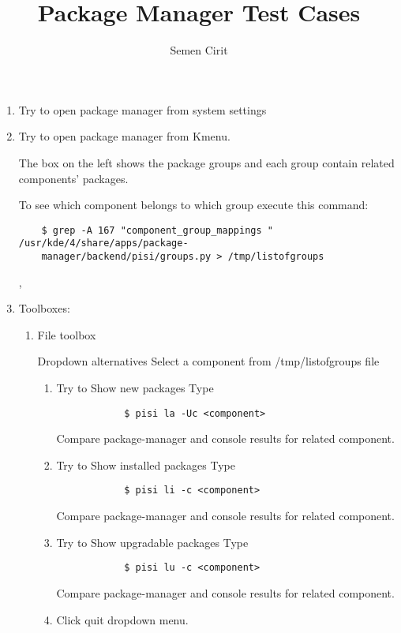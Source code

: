 \documentclass[a4paper,10pt]{article}
\title{Package Manager Test Cases}
\author{Semen Cirit}
\begin{document}
\maketitle

\begin{enumerate}
    \item Try to open package manager from system settings
    \item Try to open package manager from Kmenu.
    

    The box on the left shows the package groups and each group contain related components' packages.

    To see which component belongs to which group execute this command:
    \begin{verbatim}
    $ grep -A 167 "component_group_mappings " /usr/kde/4/share/apps/package-
    manager/backend/pisi/groups.py > /tmp/listofgroups
    \end{verbatim} ,
  \item Toolboxes:
    \begin{enumerate}
        \item File toolbox
    
        Dropdown alternatives
        Select a component from /tmp/listofgroups file
        \begin{enumerate}
            \item Try to Show new packages
            Type
            \begin{verbatim}
            $ pisi la -Uc <component>
            \end{verbatim}
            Compare package-manager and console results for related component.
            \item Try to Show installed packages
            Type
            \begin{verbatim}
            $ pisi li -c <component>
            \end{verbatim}
            Compare package-manager and console results for related component.
    
            \item Try to Show upgradable packages
            Type
            \begin{verbatim}
            $ pisi lu -c <component>
            \end{verbatim}
            Compare package-manager and console results for related component.
    
            \item Click quit dropdown menu. 
    

\end{enumerate}
\end{enumerate}
\end{enumerate}
\end{document}

